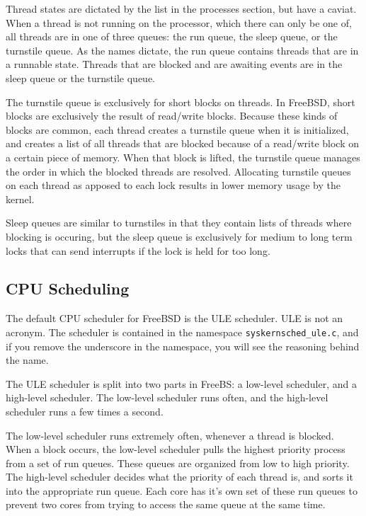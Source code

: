 Thread states are dictated by the list in the processes section, but have a caviat.
When a thread is not running on the processor, which there can only be one of,
all threads are in one of three queues: the run queue, the sleep queue, or the
turnstile queue. As the names dictate, the run queue contains threads that are
in a runnable state. Threads that are blocked and are awaiting events are in the
sleep queue or the turnstile queue.

The turnstile queue is exclusively for short blocks on threads. In FreeBSD, short
blocks are exclusively the result of read/write blocks. Because these kinds of
blocks are common, each thread creates a turnstile queue when it is initialized,
and creates a list of all threads that are blocked because of a read/write block
on a certain piece of memory. When that block is lifted, the turnstile queue manages
the order in which the blocked threads are resolved. Allocating turnstile queues
on each thread as apposed to each lock results in lower memory usage by the kernel.

Sleep queues are similar to turnstiles in that they contain lists of threads
where blocking is occuring, but the sleep queue is exclusively for medium to long
term locks that can send interrupts if the lock is held for too long. \cite{kirkgeorgebsd}
  \subsection{CPU Scheduling}
The default CPU scheduler for FreeBSD is the ULE scheduler. ULE is not an acronym.
\cite{kirkgeorgebsd} The scheduler is contained in the namespace
\texttt{\/sys\/kern\/sched\_ule.c}, and if you remove the underscore in the namespace,
you will see the reasoning behind the name.

The ULE scheduler is split into two parts in FreeBS: a low-level scheduler, and
a high-level scheduler. The low-level scheduler runs often, and the high-level
scheduler runs a few times a second.

The low-level scheduler runs extremely often, whenever a thread is blocked. When
a block occurs, the low-level scheduler pulls the highest priority process from
a set of run queues. These queues are organized from low to high priority. The
high-level scheduler decides what the priority of each thread is, and sorts it
into the appropriate run queue. Each core has it's own set of these run queues
to prevent two cores from trying to access the same queue at the same time.

